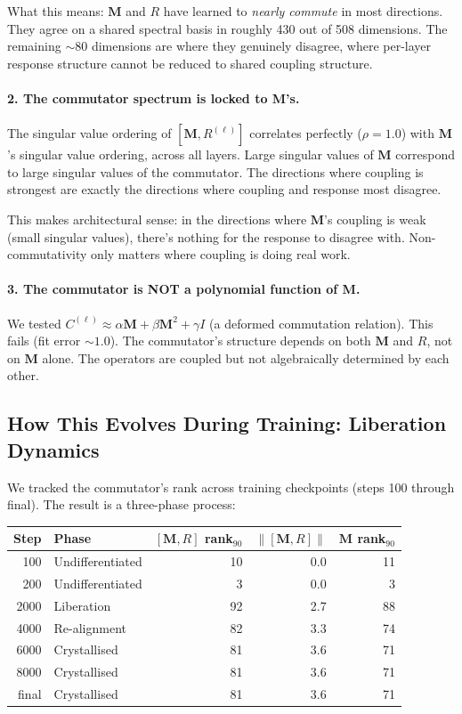 \documentclass[11pt, a4paper]{article}
\newcommand{\M}{\mathbf{M}}
\theoremstyle{remark}
\begin{document}
What this means: $\M$ and $R$ have learned to \emph{nearly commute} in most directions.
They agree on a shared spectral basis in roughly 430 out of 508 dimensions.
The remaining $\sim$80 dimensions are where they genuinely disagree, where per-layer response structure cannot be reduced to shared coupling structure.

\paragraph{2. The commutator spectrum is locked to M's.}
The singular value ordering of $[\M, R^{(\ell)}]$ correlates perfectly ($\rho = 1.0$) with $\M$'s singular value ordering, across all layers.
Large singular values of $\M$ correspond to large singular values of the commutator.
The directions where coupling is strongest are exactly the directions where coupling and response most disagree.

This makes architectural sense: in the directions where $\M$'s coupling is weak (small singular values), there's nothing for the response to disagree with.
Non-commutativity only matters where coupling is doing real work.

\paragraph{3. The commutator is NOT a polynomial function of M.}
We tested $C^{(\ell)} \approx \alpha \M + \beta \M^2 + \gamma I$ (a deformed commutation relation). This fails (fit error $\sim 1.0$).
The commutator's structure depends on both $\M$ and $R$, not on $\M$ alone.
The operators are coupled but not algebraically determined by each other.

\subsection{How This Evolves During Training: Liberation Dynamics}
\label{sec:liberation}

We tracked the commutator's rank across training checkpoints (steps 100 through final).
The result is a three-phase process:

\begin{center}\small
\begin{tabular}{rlrrr}
\toprule
\textbf{Step} & \textbf{Phase} & $[\M,R]$ \textbf{rank}$_{90}$ & $\|[\M,R]\|$ & $\M$ \textbf{rank}$_{90}$ \\
\midrule
100 & Undifferentiated & 10 & 0.0 & 11 \\
200 & Undifferentiated & 3 & 0.0 & 3 \\
2000 & Liberation & 92 & 2.7 & 88 \\
4000 & Re-alignment & 82 & 3.3 & 74 \\
6000 & Crystallised & 81 & 3.6 & 71 \\
8000 & Crystallised & 81 & 3.6 & 71 \\
final & Crystallised & 81 & 3.6 & 71 \\
\bottomrule
\end{tabular}
\end{center}
\end{document}
